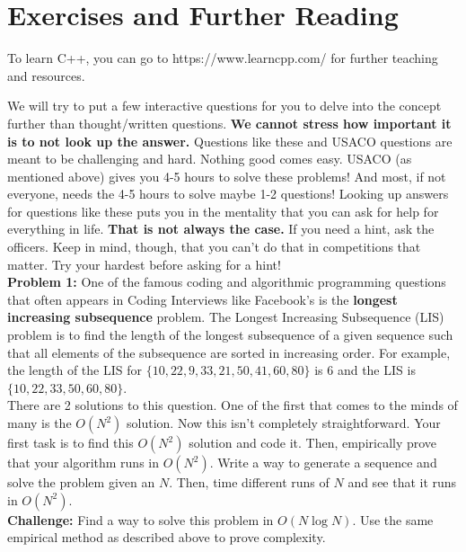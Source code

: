 \documentclass{article}
\begin{document}
\section{Exercises and Further Reading}
To learn C++, you can go to https://www.learncpp.com/ for further teaching and resources. 

We will try to put a few interactive questions for you to delve into the concept further than thought/written questions. \textbf{We cannot stress how important it is to not look up the answer.} Questions like these and USACO questions are meant to be challenging and hard. Nothing good comes easy. USACO (as mentioned above) gives you 4-5 hours to solve these problems! And most, if not everyone, needs the 4-5 hours to solve maybe 1-2 questions! Looking up answers for questions like these puts you in the mentality that you can ask for help for everything in life. \textbf{That is not always the case.} If you need a hint, ask the officers. Keep in mind, though, that you can't do that in competitions that matter. Try your hardest before asking for a hint! \\ 

\textbf{Problem 1:} One of the famous coding and algorithmic programming questions that often appears in Coding Interviews like Facebook's is the \textbf{longest increasing subsequence} problem. The Longest Increasing Subsequence (LIS) problem is to find the length of the longest subsequence of a given sequence such that all elements of the subsequence are sorted in increasing order. For example, the length of the LIS for $\{10, 22, 9, 33, 21, 50, 41, 60, 80\}$ is $6$ and the LIS is $\{10, 22, 33, 50, 60, 80\}$. \\

There are 2 solutions to this question. One of the first that comes to the minds of many is the $O(N^2)$ solution. Now this isn't completely straightforward. Your first task is to find this $O(N^2)$ solution and code it. Then, empirically prove that your algorithm runs in $O(N^2)$. Write a way to generate a sequence and solve the problem given an $N$. Then, time different runs of $N$ and see that it runs in $O(N^2)$. \\

\textbf{Challenge:} Find a way to solve this problem in $O(N\log N)$. Use the same empirical method as described above to prove complexity. \\
\end{document}
